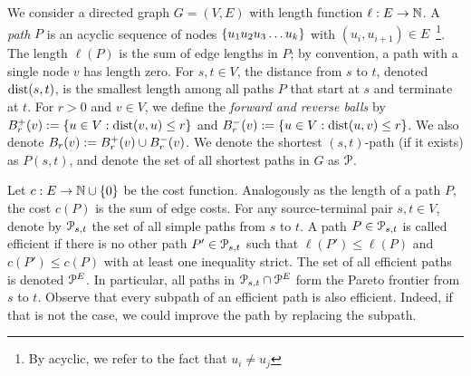 
We consider a directed graph $G=(V,E)$ with length function $\ell:E\to \N$.
A \emph{path} $P$ is an acyclic sequence of nodes $\crl*{u_1u_2u_3\ldots u_k}$ with $(u_i,u_{i+1})\in E$~\footnote{By acyclic, we refer to the fact that $u_i\neq u_j$}. 
The length $\ell(P)$ is the sum of edge lengths in $P$; by convention, a path with a single node $v$ has length zero.
For $s,t\in V$, the distance from $s$ to $t$, denoted $\dist(s,t)$, is the smallest length among all paths $P$ that start at $s$ and terminate at $t$.
For $r>0$ and $v\in V$, we define the \emph{forward and reverse balls} by $\Bf_r(v):=\{u\in V: \dist(v,u)\leq r\}$ and $\Bb_r(v):=\{u\in V: \dist(u,v)\leq r\}$.
We also denote $B_r(v):=\Bf_r(v)\cup\Bb_r(v)$.
We denote the shortest $(s,t)$-path (if it exists) as $P(s,t)$, and denote the set of all shortest paths in $G$ as $\calP$.

Let $c:E\to \N\cup\{0\}$ be the cost function.
Analogously as the length of a path $P$, the cost $c(P)$ is the sum of edge costs.
For any source-terminal pair $s,t\in V$, denote by $\calP_{s,t}$ the set of all simple paths from $s$ to $t$.
A path $P\in \calP_{s,t}$ is called efficient if there is no other path $P'\in \calP_{s,t}$ such that $\ell(P')\leq \ell(P)$ and $c(P')\leq c(P)$ with at least one inequality strict.
The set of all efficient paths is denoted $\PE$.
In particular, all paths in $\calP_{s,t}\cap\PE$ form the Pareto frontier from $s$ to $t$.
Observe that every subpath of an efficient path is also efficient.
Indeed, if that is not the case, we could improve the path by replacing the subpath.

